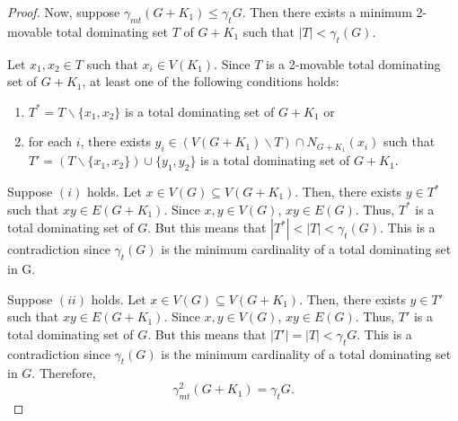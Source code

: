 \documentclass[10pt,a4paper]{amsart}
\begin{document}
\begin{proof}
	Now, suppose $\gamma_{mt} (G+K_1) \leq \gamma_t G$. Then there exists a minimum 2-movable total dominating set $T$ of $G+K_1$ such that $|T| < \gamma_t (G)$.
	
	Let $x_1, x_2 \in T$ such that $x_i \in V(K_1)$. Since $T$ is a 2-movable total dominating set of $G+K_1$, at least one of the following conditions holds:
	\begin{enumerate}
		\item[(i)] $T^* = T \backslash \{x_1, x_2\}$ is a total dominating set of $G+K_1$ or
		\item[(ii)] for each $i$, there exists $y_i \in (V(G+K_1) \backslash T) \cap N_{G+K_1}(x_i)$ such that\\
		$T' = (T \backslash \{x_1, x_2\}) \cup \{y_1, y_2\}$ is a total dominating set of $G+K_1$.
	\end{enumerate}	
	
	Suppose $(i)$ holds. Let $x \in V(G) \subseteq V(G+K_1)$. Then, there exists $y \in T^*$ such that $xy \in E(G+K_1)$. Since $x, y \in V(G)$, $xy \in E(G)$. Thus, $T^*$ is a total dominating set of $G$. But this means that $|T^*| < |T| < \gamma_t (G)$. This is a contradiction since $\gamma_t (G)$ is the minimum cardinality of a total dominating set in G.
	
	Suppose $(ii)$ holds. Let $x \in V(G) \subseteq V(G+K_1)$. Then, there exists $y \in T'$ such that $xy \in E(G+K_1)$. Since $x,y \in V(G)$, $xy \in E(G)$. Thus, $T'$ is a total dominating set of $G$. But this means that $|T'|=|T| < \gamma_t G$. This is a contradiction since $\gamma_t (G)$ is the minimum cardinality of a total dominating set in $G$. Therefore, $$\gamma_{mt}^2 (G+K_1) = \gamma_t G.$$
\end{proof}
\end{document}
